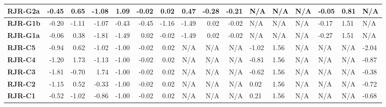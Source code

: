 \begin{table}
\begin{center}
{\begin{tabular*}{\textwidth}{@{\extracolsep{\fill}}lrrrrrrrrr}
\hline
{\bf RJR-G2a} & -0.45   & 0.65   & -1.08   & 1.09   & -0.02   & 0.02   & 0.47   & -0.28   & -0.21   & N/A   & N/A   & N/A   & -0.05   & 0.81   & N/A  \\
\hline
{\bf RJR-G1b} & -0.20   & -1.11   & -1.07   & -0.43   & -0.45   & -1.16   & -1.49   & 0.02   & -0.02   & N/A   & N/A   & N/A   & -0.17   & 1.51   & N/A  \\
\hline
{\bf RJR-G1a} & -0.06   & 0.38   & -1.81   & -1.49   & 0.02   & -0.02   & -1.49   & 0.02   & -0.02   & N/A   & N/A   & N/A   & -0.27   & 1.51   & N/A  \\
\hline
{\bf RJR-C5} & -0.94   & 0.62   & -1.02   & -1.00   & -0.02   & 0.02   & N/A   & N/A   & N/A   & -1.02   & 1.56   & N/A   & N/A   & N/A   & -2.04  \\
\hline
{\bf RJR-C4} & -1.20   & 1.73   & -1.13   & -1.00   & -0.02   & 0.02   & N/A   & N/A   & N/A   & -0.81   & 1.56   & N/A   & N/A   & N/A   & -0.87  \\
\hline
{\bf RJR-C3} & -1.81   & -0.70   & 1.74   & -1.00   & -0.02   & 0.02   & N/A   & N/A   & N/A   & -0.62   & 1.56   & N/A   & N/A   & N/A   & -0.38  \\
\hline
{\bf RJR-C2} & -1.15   & 0.52   & -0.33   & -1.00   & -0.02   & 0.02   & N/A   & N/A   & N/A   & 0.02   & 1.56   & N/A   & N/A   & N/A   & -0.72  \\
\hline
{\bf RJR-C1} & -0.52   & -1.02   & -0.86   & -1.00   & -0.02   & 0.02   & N/A   & N/A   & N/A   & 0.21   & 1.56   & N/A   & N/A   & N/A   & -0.68  \\
\hline


\end{tabular*}
}
\end{center}

\end{table}
